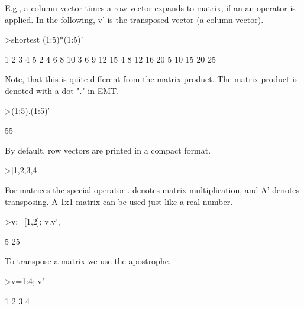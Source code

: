 \documentclass{article}
\begin{document}
\begin{eulernotebook}
\begin{eulercomment}
\begin{eulercomment}
\begin{eulercomment}
\begin{eulercomment}
\begin{eulercomment}
\begin{eulercomment}
\begin{eulercomment}
E.g., a column vector times a row vector expands to matrix, if an an operator
is applied. In the following, v' is the transposed vector (a column vector).
\end{eulercomment}
\begin{eulerprompt}
>shortest (1:5)*(1:5)'
\end{eulerprompt}
\begin{euleroutput}
       1      2      3      4      5 
       2      4      6      8     10 
       3      6      9     12     15 
       4      8     12     16     20 
       5     10     15     20     25 
\end{euleroutput}
\begin{eulercomment}
Note, that this is quite different from the matrix product. The matrix
product is denoted with a dot "." in EMT.
\end{eulercomment}
\begin{eulerprompt}
>(1:5).(1:5)'
\end{eulerprompt}
\begin{euleroutput}
  55
\end{euleroutput}
\begin{eulercomment}
By default, row vectors are printed in a compact format.
\end{eulercomment}
\begin{eulerprompt}
>[1,2,3,4]
\end{eulerprompt}
\begin{euleroutput}
  [1,  2,  3,  4]
\end{euleroutput}
\begin{eulercomment}
For matrices the special operator . denotes matrix multiplication, and A'
denotes transposing. A 1x1 matrix can be used just like a real number.
\end{eulercomment}
\begin{eulerprompt}
>v:=[1,2]; v.v', %
\end{eulerprompt}
\begin{euleroutput}
  5
  25
\end{euleroutput}
\begin{eulercomment}
To transpose a matrix we use the apostrophe.
\end{eulercomment}
\begin{eulerprompt}
>v=1:4; v'
\end{eulerprompt}
\begin{euleroutput}
              1 
              2 
              3 
              4 
\end{euleroutput}

\end{eulercomment}
\end{eulercomment}
\end{eulercomment}
\end{eulercomment}
\end{eulercomment}
\end{eulercomment}
\end{eulernotebook}
\end{document}
